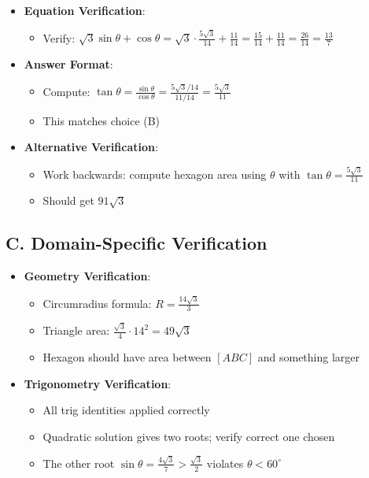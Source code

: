 \documentclass[12pt]{article}
\begin{document}
\begin{verificationbox}
\begin{itemize}[leftmargin=*]
    \item \textbf{Equation Verification}:
    \begin{itemize}
        \item Verify: $\sqrt{3}\sin\theta + \cos\theta = \sqrt{3} \cdot \frac{5\sqrt{3}}{14} + \frac{11}{14} = \frac{15}{14} + \frac{11}{14} = \frac{26}{14} = \frac{13}{7}$ \checkmark
    \end{itemize}
    
    \item \textbf{Answer Format}:
    \begin{itemize}
        \item Compute: $\tan\theta = \frac{\sin\theta}{\cos\theta} = \frac{5\sqrt{3}/14}{11/14} = \frac{5\sqrt{3}}{11}$
        \item This matches choice (B) \checkmark
    \end{itemize}
    
    \item \textbf{Alternative Verification}:
    \begin{itemize}
        \item Work backwards: compute hexagon area using $\theta$ with $\tan\theta = \frac{5\sqrt{3}}{11}$
        \item Should get $91\sqrt{3}$
    \end{itemize}
\end{itemize}

\subsection*{C. Domain-Specific Verification}
\begin{itemize}[leftmargin=*]
    \item \textbf{Geometry Verification}:
    \begin{itemize}
        \item Circumradius formula: $R = \frac{14\sqrt{3}}{3}$ \checkmark
        \item Triangle area: $\frac{\sqrt{3}}{4} \cdot 14^2 = 49\sqrt{3}$ \checkmark
        \item Hexagon should have area between $[ABC]$ and something larger
    \end{itemize}
    
    \item \textbf{Trigonometry Verification}:
    \begin{itemize}
        \item All trig identities applied correctly
        \item Quadratic solution gives two roots; verify correct one chosen
        \item The other root $\sin\theta = \frac{4\sqrt{3}}{7} > \frac{\sqrt{3}}{2}$ violates $\theta < 60^{\circ}$
    \end{itemize}
\end{itemize}
\end{verificationbox}
\end{document}
